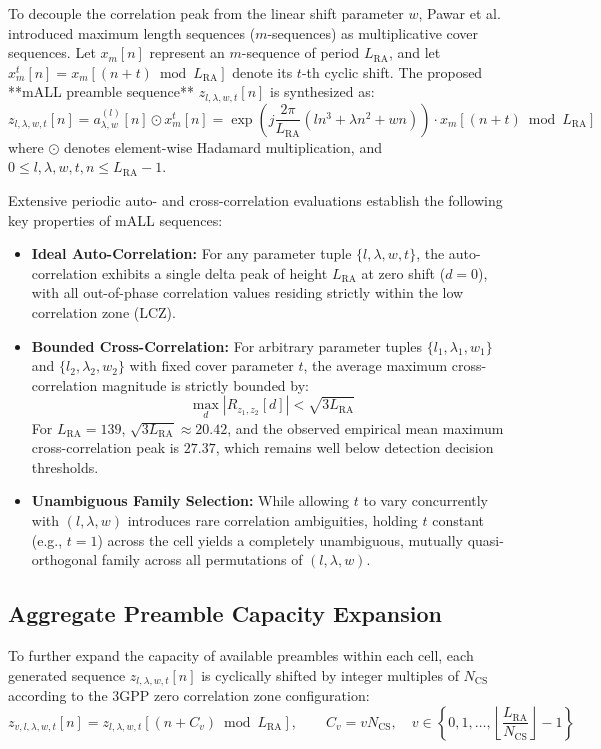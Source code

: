 To decouple the correlation peak from the linear shift parameter $w$, Pawar et al. \cite{pawar2023high} introduced maximum length sequences ($m$-sequences) as multiplicative cover sequences. Let $x_m[n]$ represent an $m$-sequence of period $L_{\mathrm{RA}}$, and let $x_m^t[n] = x_m[(n + t) \bmod L_{\mathrm{RA}}]$ denote its $t$-th cyclic shift. The proposed **mALL preamble sequence** $z_{l, \lambda, w, t}[n]$ is synthesized as:
\begin{equation}
    \label{eq:mall_definition}
    z_{l, \lambda, w, t}[n] = a_{\lambda, w}^{(l)}[n] \odot x_m^t[n] = \exp\left( j \frac{2\pi}{L_{\mathrm{RA}}} \left( l n^3 + \lambda n^2 + w n \right) \right) \cdot x_m[(n + t) \bmod L_{\mathrm{RA}}]
\end{equation}
where $\odot$ denotes element-wise Hadamard multiplication, and $0 \le l, \lambda, w, t, n \le L_{\mathrm{RA}} - 1$.

Extensive periodic auto- and cross-correlation evaluations establish the following key properties of mALL sequences:
\begin{itemize}
    \item \textbf{Ideal Auto-Correlation:} For any parameter tuple $\{l, \lambda, w, t\}$, the auto-correlation exhibits a single delta peak of height $L_{\mathrm{RA}}$ at zero shift ($d = 0$), with all out-of-phase correlation values residing strictly within the low correlation zone (LCZ).
    \item \textbf{Bounded Cross-Correlation:} For arbitrary parameter tuples $\{l_1, \lambda_1, w_1\}$ and $\{l_2, \lambda_2, w_2\}$ with fixed cover parameter $t$, the average maximum cross-correlation magnitude is strictly bounded by:
    \begin{equation}
        \max_d |R_{z_1, z_2}[d]| < \sqrt{3 L_{\mathrm{RA}}}
    \end{equation}
    For $L_{\mathrm{RA}} = 139$, $\sqrt{3 L_{\mathrm{RA}}} \approx 20.42$, and the observed empirical mean maximum cross-correlation peak is $27.37$, which remains well below detection decision thresholds.
    \item \textbf{Unambiguous Family Selection:} While allowing $t$ to vary concurrently with $(l, \lambda, w)$ introduces rare correlation ambiguities, holding $t$ constant (e.g., $t = 1$) across the cell yields a completely unambiguous, mutually quasi-orthogonal family across all permutations of $(l, \lambda, w)$.
\end{itemize}

\subsection{Aggregate Preamble Capacity Expansion}
To further expand the capacity of available preambles within each cell, each generated sequence $z_{l, \lambda, w, t}[n]$ is cyclically shifted by integer multiples of $N_{\mathrm{CS}}$ according to the 3GPP zero correlation zone configuration:
\begin{equation}
    z_{v, l, \lambda, w, t}[n] = z_{l, \lambda, w, t}[(n + C_v) \bmod L_{\mathrm{RA}}], \qquad C_v = v N_{\mathrm{CS}}, \quad v \in \left\{ 0, 1, \dots, \left\lfloor \frac{L_{\mathrm{RA}}}{N_{\mathrm{CS}}} \right\rfloor - 1 \right\}
\end{equation}

